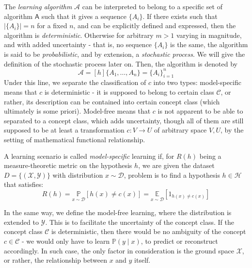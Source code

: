 The \textit{learning algorithm} $\mathcal{A}$ can be interpreted to belong to a specific set of algorithm $\mathsf{A}$ such that it gives a sequence $\{ A_{i} \}$. If there exists such that $\lvert\{A_i\}\rvert=n$ for a fixed $n$, and can be explicitly defined and expressed, then the algorithm is \textit{deterministic}. Otherwise for arbitrary $m>1$ varying in magnitude, and with added uncertainty - that is, no sequence $\{A_i\}$ is the same, the algorithm is said to be \textit{probabilistic}, and by extension, a \textit{stochastic process}. We will give the definition of the stochastic process later on. Then, the algorithm is denoted by  $$\mathcal{A}=[h]\{ A_{1},\dots,A_{n} \}=\{ A_{i} \}_{i=1}^{n}$$
Under this line, we separate the classification of $c$ into two types: model-specific means that $c$ is deterministic - it is supposed to belong to certain class $\mathcal{C}$, or rather, its description can be contained into certain concept class (which ultimately is some priori). Model-free means that $c$ is not apparent to be able to separated to a concept class, which adds uncertainty, though all of them are still supposed to be at least a transformation $c:V\to U$ of arbitrary space $V,U$, by the setting of mathematical functional relationship. 
\begin{definition}
    A learning scenario is called \textit{model-specific} learning if, for $R(h)$ being a measure-theoretic metric on the hypothesis $h$, we are given the dataset $D=\{ (\mathcal{X},\mathcal{Y}) \}$ with distribution $x\sim \mathcal{D}$, problem is to find a hypothesis $h\in\mathcal{H}$ that satisfies: \begin{equation}
        R(h) = \underset{x\sim \mathcal{D}}{\mathbb{P}} [h(x)\neq c(x)] = \underset{x\sim \mathcal{D}}{\mathbb{E}} [1_{h(x)\neq c(x)}]
    \end{equation}
\end{definition}

In the same way, we define the model-free learning, where the distribution is extended to $\mathcal{Y}$. This is to facilitate the uncertainty of the concept class. If the concept class $\mathcal{C}$ is deterministic, then there would be no ambiguity of the concept $c\in \mathcal{C}$ - we would only have to learn $\mathbb{P}(y\mid x)$, to predict or reconstruct accordingly. In such case, the only factor in consideration is the ground space $\mathcal{X}$, or rather, the relationship between $x$ and $y$ itself. 

